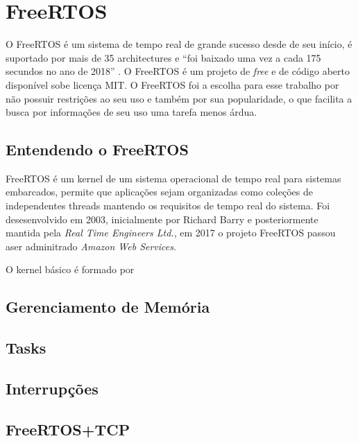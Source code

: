 \chapter{FreeRTOS}


O FreeRTOS é um sistema de tempo real de grande sucesso desde de seu início,
é suportado por mais de 35 architectures e ``foi baixado uma vez a cada 175
secundos no ano de 2018'' \cite{FreeRTOS_history}. O FreeRTOS é um projeto de
\textit{free} e de código aberto disponível sobe licença MIT. O FreeRTOS foi
a escolha para esse trabalho por não possuir restrições ao seu uso e também
por sua popularidade, o que facilita a busca por informações de seu uso uma
tarefa menos árdua.

\section{Entendendo o FreeRTOS}

FreeRTOS é um kernel de um sistema operacional de tempo real para sistemas
embarcados, permite que aplicações sejam organizadas como coleções de 
independentes threads mantendo os requisitos de tempo real do sistema.
Foi desesenvolvido em 2003, inicialmente por Richard Barry e posteriormente
mantida pela \textit{Real Time Engineers Ltd.}, em 2017 o projeto 
FreeRTOS passou aser adminitrado \textit{Amazon Web Services}.

O kernel básico é formado por 

 

\section{Gerenciamento de Memória}

\section{Tasks}

\section{Interrupções}




\section{FreeRTOS+TCP}

